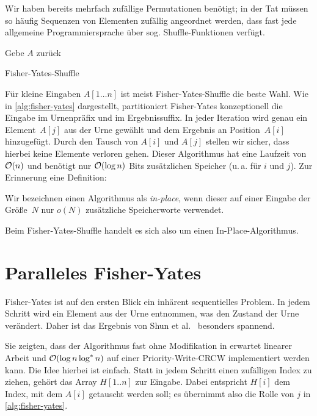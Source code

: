 Wir haben bereits mehrfach zufällige Permutationen benötigt;
in der Tat müssen so häufig Sequenzen von Elementen zufällig angeordnet werden, dass fast jede allgemeine Programmiersprache über sog. Shuffle-Funktionen verfügt.

\begin{algorithm}
    Gebe $A$ zurück
    \caption{Fisher-Yates-Shuffle}
    \label{alg:fisher-yates}
\end{algorithm}

Für kleine Eingaben $A[1 \ldots n]$ ist meist Fisher-Yates-Shuffle die beste Wahl.
Wie in \cref{alg:fisher-yates} dargestellt, partitioniert Fisher-Yates konzeptionell die Eingabe im Urnenpräfix und im Ergebnissuffix.
In jeder Iteration wird genau ein Element~$A[j]$ aus der Urne gewählt und dem Ergebnis an Position~$A[i]$ hinzugefügt.
Durch den Tausch von $A[i]$ und $A[j]$ stellen wir sicher, dass hierbei keine Elemente verloren gehen.
Dieser Algorithmus hat eine Laufzeit von $\mathcal{O}\!\left(n\right)$ und benötigt nur $\mathcal{O}\!\left(\log n\right)$ Bits zusätzlichen Speicher (u.\,a. für $i$ und $j$).
Zur Erinnerung eine Definition:

\begin{definition}
    Wir bezeichnen einen Algorithmus als \emph{in-place}, wenn dieser auf einer Eingabe der Größe~$N$ nur $o(N)$ zusätzliche Speicherworte verwendet.
\end{definition}

Beim Fisher-Yates-Shuffle handelt es sich also um einen In-Place-Algorithmus.

\section{Paralleles Fisher-Yates}
Fisher-Yates ist auf den ersten Blick ein inhärent sequentielles Problem.
In jedem Schritt wird ein Element aus der Urne entnommen, was den Zustand der Urne verändert.
Daher ist das Ergebnis von Shun et al.~\cite{DBLP:conf/soda/ShunGBFG15} besonders spannend.

Sie zeigten, dass der Algorithmus fast ohne Modifikation in erwartet linearer Arbeit und $\mathcal{O}\!\left(\log n \log^* n\right)$ auf einer Priority-Write-CRCW implementiert werden kann.
Die Idee hierbei ist einfach.
Statt in jedem Schritt einen zufälligen Index zu ziehen, gehört das Array $H[1 .. n]$ zur Eingabe.
Dabei entspricht $H[i]$ dem Index, mit dem $A[i]$ getauscht werden soll; es übernimmt also die Rolle von $j$ in \cref{alg:fisher-yates}.


